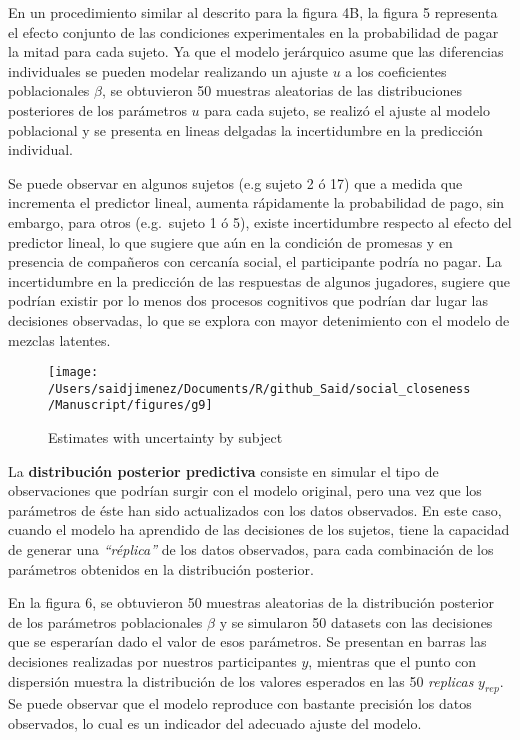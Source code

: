 \documentclass[]{article}
\begin{document}
En un procedimiento similar al descrito para la figura 4B, la figura 5
representa el efecto conjunto de las condiciones experimentales en la
probabilidad de pagar la mitad para cada sujeto. Ya que el modelo
jerárquico asume que las diferencias individuales se pueden modelar
realizando un ajuste \(u\) a los coeficientes poblacionales \(\beta\),
se obtuvieron 50 muestras aleatorias de las distribuciones posteriores
de los parámetros \(u\) para cada sujeto, se realizó el ajuste al modelo
poblacional y se presenta en lineas delgadas la incertidumbre en la
predicción individual.

Se puede observar en algunos sujetos (e.g sujeto 2 ó 17) que a medida
que incrementa el predictor lineal, aumenta rápidamente la probabilidad
de pago, sin embargo, para otros (e.g.~sujeto 1 ó 5), existe
incertidumbre respecto al efecto del predictor lineal, lo que sugiere
que aún en la condición de promesas y en presencia de compañeros con
cercanía social, el participante podría no pagar. La incertidumbre en la
predicción de las respuestas de algunos jugadores, sugiere que podrían
existir por lo menos dos procesos cognitivos que podrían dar lugar las
decisiones observadas, lo que se explora con mayor detenimiento con el
modelo de mezclas latentes.

\begin{figure}

{\centering \texttt{[image: /Users/saidjimenez/Documents/R/github\_Said/social\_closeness/Manuscript/figures/g9]} 

}

\caption{Estimates with uncertainty by subject}\label{fig:fig5}
\end{figure}

La \textbf{distribución posterior predictiva} consiste en simular el
tipo de observaciones que podrían surgir con el modelo original, pero
una vez que los parámetros de éste han sido actualizados con los datos
observados. En este caso, cuando el modelo ha aprendido de las
decisiones de los sujetos, tiene la capacidad de generar una
\emph{``réplica''} de los datos observados, para cada combinación de los
parámetros obtenidos en la distribución posterior.

En la figura 6, se obtuvieron 50 muestras aleatorias de la distribución
posterior de los parámetros poblacionales \(\beta\) y se simularon 50
datasets con las decisiones que se esperarían dado el valor de esos
parámetros. Se presentan en barras las decisiones realizadas por
nuestros participantes \(y\), mientras que el punto con dispersión
muestra la distribución de los valores esperados en las 50
\emph{replicas} \(y_{rep}\). Se puede observar que el modelo reproduce
con bastante precisión los datos observados, lo cual es un indicador del
adecuado ajuste del modelo.
\end{document}
